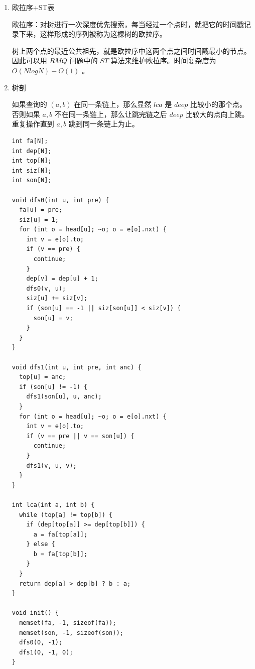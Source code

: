 \documentclass[11pt]{article}
\begin{document}
\begin{enumerate}
这是一个离线算法，时间复杂度为 $O(N\alpha(N))$ ，约为 $O(N)$ 。

\begin{verbatim}
const int N = 100000 + 5;
const int Q = 200000 + 5;

int s[N];
int lca[Q];
vector < pair <int, int> > q[N];

int get(int x) {
  return s[x] == x ? x : s[x] = get(s[x]);
}

void dfs(int u, int pre) {
  col[u] = 1;
  for (int o = head[u]; ~o; o = e[o].nxt) {
    int v = e[o].to;
    if (v == pre) {
      continue;
    }
    dfs(v, u);
    s[v] = u;
  }
  col[u] = 2;
  for (int i = 0; i < q[u].size(); ++i) {
    int v = q[u][i].first;
    if (col[v] == 2) {
      lca[q[u][i].second] = get(v);
    }
  }
}


int main() {
  for (int i = 0; i < n; ++i) {
    s[i] = i;
  }
  for (int i = 0; i < q; ++i) {
    int x = read() - 1;
    int y = read() - 1;
    q[x].push_back(make_pair(y, i));
    q[y].push_back(make_pair(x, i));
  }
  dfs(0, -1);
  return 0;
}
\end{verbatim}
\item 欧拉序+ST表
\label{sec-6-5-2-3}

欧拉序：对树进行一次深度优先搜索，每当经过一个点时，就把它的时间戳记录下来，这样形成的序列被称为这棵树的欧拉序。

树上两个点的最近公共祖先，就是欧拉序中这两个点之间时间戳最小的节点。因此可以用 $RMQ$ 问题中的 $ST$ 算法来维护欧拉序。时间复杂度为 $O(NlogN)-O(1)$ 。

\item 树剖
\label{sec-6-5-2-4}

如果查询的 $(a,b)$ 在同一条链上，那么显然 $lca$ 是 $deep$ 比较小的那个点。否则如果 $a,b$ 不在同一条链上，那么让跳完链之后 $deep$ 比较大的点向上跳。重复操作直到 $a,b$ 跳到同一条链上为止。

\begin{verbatim}
int fa[N];
int dep[N];
int top[N];
int siz[N];
int son[N];

void dfs0(int u, int pre) {
  fa[u] = pre;
  siz[u] = 1;
  for (int o = head[u]; ~o; o = e[o].nxt) {
    int v = e[o].to;
    if (v == pre) {
      continue;
    }
    dep[v] = dep[u] + 1;
    dfs0(v, u);
    siz[u] += siz[v];
    if (son[u] == -1 || siz[son[u]] < siz[v]) {
      son[u] = v;
    }
  }
}

void dfs1(int u, int pre, int anc) {
  top[u] = anc;
  if (son[u] != -1) {
    dfs1(son[u], u, anc);
  }
  for (int o = head[u]; ~o; o = e[o].nxt) {
    int v = e[o].to;
    if (v == pre || v == son[u]) {
      continue;
    }
    dfs1(v, u, v);
  }
}

int lca(int a, int b) {
  while (top[a] != top[b]) {
    if (dep[top[a]] >= dep[top[b]]) {
      a = fa[top[a]];
    } else {
      b = fa[top[b]];
    }
  }
  return dep[a] > dep[b] ? b : a;
}

void init() {
  memset(fa, -1, sizeof(fa));
  memset(son, -1, sizeof(son));
  dfs0(0, -1);
  dfs1(0, -1, 0);
}
\end{verbatim}
\end{enumerate}
\end{document}
